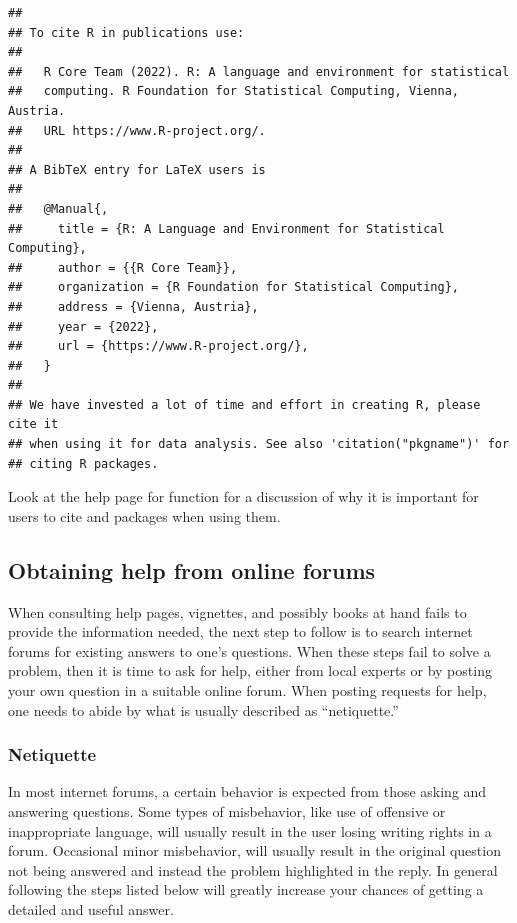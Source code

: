 \documentclass[krantz2]{krantz}\usepackage{knitr}
\begin{document}
\begin{knitrout}\footnotesize
{}\color{fgcolor}\begin{kframe}
\begin{alltt}
\hlstd{()}
\end{alltt}
\begin{verbatim}
## 
## To cite R in publications use:
## 
##   R Core Team (2022). R: A language and environment for statistical
##   computing. R Foundation for Statistical Computing, Vienna, Austria.
##   URL https://www.R-project.org/.
## 
## A BibTeX entry for LaTeX users is
## 
##   @Manual{,
##     title = {R: A Language and Environment for Statistical Computing},
##     author = {{R Core Team}},
##     organization = {R Foundation for Statistical Computing},
##     address = {Vienna, Austria},
##     year = {2022},
##     url = {https://www.R-project.org/},
##   }
## 
## We have invested a lot of time and effort in creating R, please cite it
## when using it for data analysis. See also 'citation("pkgname")' for
## citing R packages.
\end{verbatim}
\end{kframe}
\end{knitrout}

\begin{playground}
  Look at the help page for function  for a discussion of why it is important for users to cite \Rpgrm and packages when using them.
\end{playground}

\subsection{Obtaining help from online forums}\label{sec:intro:net:help}

When consulting help pages, vignettes, and possibly books at hand fails to provide the information needed, the next step to follow is to search internet forums for existing answers to one's questions. When these steps fail to solve a problem, then it is time to ask for help, either from local experts or by posting your own question in a suitable online forum. When posting requests for help, one needs to abide by what is usually described as ``netiquette.''

\subsubsection{Netiquette}
In most internet forums, a certain behavior is expected from those asking and answering questions. Some types of misbehavior, like use of offensive or inappropriate language, will usually result in the user losing writing rights in a forum. Occasional minor misbehavior, will usually result in the original question not being answered and instead the problem highlighted in the reply. In general following the steps listed below will greatly increase your chances of getting a detailed and useful answer.
\end{document}
